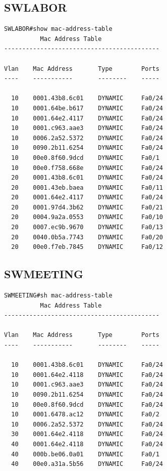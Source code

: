 \documentclass[11pt]{article}
\begin{document}
\subsection{SWLABOR}
\label{sec:orga2b231c}
\begin{verbatim}
SWLABOR#show mac-address-table
          Mac Address Table
-------------------------------------------

Vlan    Mac Address       Type        Ports
----    -----------       --------    -----

  10    0001.43b8.6c01    DYNAMIC     Fa0/24
  10    0001.64be.b617    DYNAMIC     Fa0/24
  10    0001.64e2.4117    DYNAMIC     Fa0/24
  10    0001.c963.aae3    DYNAMIC     Fa0/24
  10    0006.2a52.5372    DYNAMIC     Fa0/24
  10    0090.2b11.6254    DYNAMIC     Fa0/24
  10    00e0.8f60.9dcd    DYNAMIC     Fa0/1
  10    00e0.f758.668e    DYNAMIC     Fa0/24
  20    0001.43b8.6c01    DYNAMIC     Fa0/24
  20    0001.43eb.baea    DYNAMIC     Fa0/11
  20    0001.64e2.4117    DYNAMIC     Fa0/24
  20    0001.97d4.3b62    DYNAMIC     Fa0/21
  20    0004.9a2a.0553    DYNAMIC     Fa0/10
  20    0007.ec9b.9670    DYNAMIC     Fa0/13
  20    0040.0b5a.7743    DYNAMIC     Fa0/20
  20    00e0.f7eb.7845    DYNAMIC     Fa0/12
\end{verbatim}
\subsection{SWMEETING}
\label{sec:orgdcb8961}
\begin{verbatim}
SWMEETING#sh mac-address-table
          Mac Address Table
-------------------------------------------

Vlan    Mac Address       Type        Ports
----    -----------       --------    -----

  10    0001.43b8.6c01    DYNAMIC     Fa0/24
  10    0001.64e2.4118    DYNAMIC     Fa0/24
  10    0001.c963.aae3    DYNAMIC     Fa0/24
  10    0090.2b11.6254    DYNAMIC     Fa0/24
  10    00e0.8f60.9dcd    DYNAMIC     Fa0/24
  10    0001.6478.ac12    DYNAMIC     Fa0/2
  10    0006.2a52.5372    DYNAMIC     Fa0/24
  30    0001.64e2.4118    DYNAMIC     Fa0/24
  40    0001.64e2.4118    DYNAMIC     Fa0/24
  40    000b.be06.0a01    DYNAMIC     Fa0/1
  40    00e0.a31a.5b56    DYNAMIC     Fa0/24
\end{verbatim}
\end{document}
